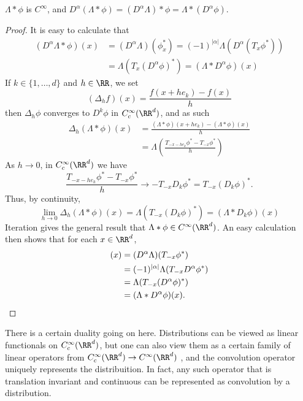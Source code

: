 \begin{theorem}
    $\Lambda * \phi$ is $C^\infty$, and $D^\alpha(\Lambda * \phi) = (D^\alpha \Lambda) * \phi = \Lambda * (D^\alpha \phi)$.
\end{theorem}
\begin{proof}
    It is easy to calculate that
    \begin{align*}
        (D^\alpha \Lambda * \phi)(x) &= (D^\alpha \Lambda)(\phi^*_x) = (-1)^{|\alpha|} \Lambda(D^\alpha (T_x \phi^*))\\
        &= \Lambda(T_x (D^\alpha \phi)^*) = (\Lambda * D^\alpha \phi)(x)
    \end{align*}
    If $k \in \{ 1, \dots, d \}$ and $h \in \RR$, we set
    \[ (\Delta_h f)(x) = \frac{f(x + he_k) - f(x)}{h} \]
    then $\Delta_h \phi$ converges to $D^k \phi$ in $C_c^\infty(\RR^d)$, and as such
    \begin{align*}
      \Delta_h(\Lambda * \phi)(x) &= \frac{(\Lambda * \phi)(x + he_k) - (\Lambda * \phi)(x)}{ h}\\
      &= \Lambda \left( \frac{T_{-x - he_k} \phi^* - T_{-x} \phi^*}{h} \right)
    \end{align*}
    As $h \to 0$, in $C_c^\infty(\RR^d)$ we have
    \[ \frac{T_{-x - he_k} \phi^* - T_{-x} \phi^*}{h} \to - T_{-x} D_k \phi^* = T_{-x} (D_k \phi)^*. \]
    Thus, by continuity,
    \[ \lim_{h \to 0} \Delta_h(\Lambda * \phi)(x) = \Lambda(T_{-x} (D_k \phi)^*) = (\Lambda * D_k \phi)(x) \]
    Iteration gives the general result that $\Lambda * \phi \in C^\infty(\RR^d)$. An easy calculation then shows that for each $x \in \RR^d$,
    \begin{align*}
      [(D^\alpha \Lambda) * \phi](x) &= (D^\alpha \Lambda)(T_{-x} \phi^*)\\
      &= (-1)^{|\alpha|} \Lambda(T_{-x} D^\alpha \phi^*)\\
      &= \Lambda(T_{-x} (D^\alpha \phi)^*)\\
      &= (\Lambda * D^\alpha \phi)(x). \qedhere
    \end{align*}
\end{proof}

There is a certain duality going on here. Distributions can be viewed as linear functionals on $C_c^\infty(\RR^d)$, but one can also view them as a certain family of linear operators from $C_c^\infty(\RR^d) \to C^\infty(\RR^d)$ , and the convolution operator uniquely represents the distribuition. In fact, any such operator that is translation invariant and continuous can be represented as convolution by a distribution.

